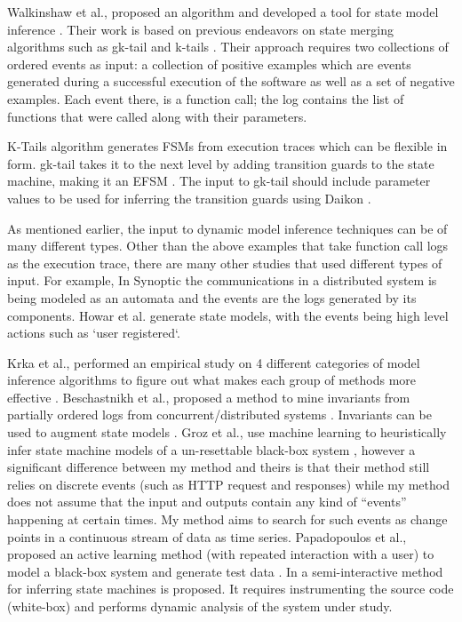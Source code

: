 Walkinshaw et al., proposed an algorithm and developed a tool for state model inference \cite{walkinshaw2016inferring}. Their work is based on previous endeavors on state merging algorithms such as gk-tail and k-tails \cite{lorenzoli2008automatic, biermann1972synthesis}. Their approach requires two collections of ordered events as input: a collection of positive examples which are events generated during a successful execution of the software as well as a set of negative examples. Each event there, is a function call; the log contains the list of functions that were called along with their parameters.

K-Tails algorithm \cite{biermann1972synthesis} generates FSMs from execution traces which can be flexible in form. gk-tail takes it to the next level by adding transition guards to the state machine, making it an EFSM \cite{lorenzoli2008automatic}. 
The input to gk-tail should include parameter values to be used for inferring the transition guards using Daikon \cite{ernst2007daikon}. 

As mentioned earlier, the input to dynamic model inference techniques can be of many different types. Other than the above examples that take function call logs as the execution trace, there are many other studies that used different types of input. For example, In Synoptic \cite{schneider2010synoptic} the communications in a distributed system is being modeled as an automata and the events are the logs generated by its components.
Howar et al. \cite{howar2012inferring} generate state models, with the events being high level actions such as `user registered`. %

Krka et al., performed an empirical study on 4 different categories of model inference algorithms to figure out what makes each group of methods more effective \cite{krka2014automatic}. Beschastnikh et al., proposed a method to mine invariants from partially ordered logs from concurrent/distributed systems \cite{beschastnikh2011mining}. Invariants can be used to augment state models \cite{beschastnikh2014inferring, beschastnikh2011leveraging}. Groz et al., use machine learning to heuristically infer state machine models of a un-resettable black-box system \cite{groz2018revisiting}, however a significant difference between my method and theirs is that their method still relies on discrete events (such as HTTP request and responses) while my method does not assume that the input and outputs contain any kind of ``events'' happening at certain times. My method aims to search for such events as change points in a continuous stream of data as time series. 
Papadopoulos et al., proposed an active learning method (with repeated interaction with a user) to model a black-box system and generate test data \cite{Papadopoulos2015}. 
In \cite{jafar2019interactive} a semi-interactive method for inferring state machines is proposed. It requires instrumenting the source code (white-box) and performs dynamic analysis of the system under study.

